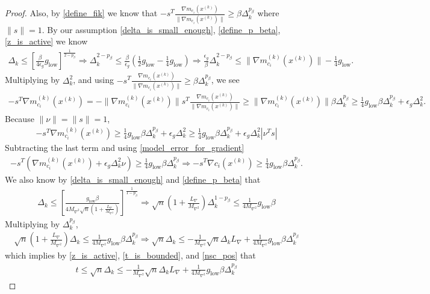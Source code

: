 \documentclass{article}
\theoremstyle{case}
\newcommand{\lipgrad}{{L_{\nabla}}}
\newcommand{\maxhessian}{{M_{\nabla^2}}}
\newcommand{\xk}{{x^{(k)}}}
\newcommand{\dk}{\Delta_k}
\newcommand{\gmcik}{{\nabla m_{c_i}^{(k)}(\xk)}}
\newcommand{\hgik}{{\frac{\nabla m_{c_i}(\xk)}{\|\nabla m_{c_i}(\xk)\|}}}
\newcommand{\mingrad}{{ g_{\text{low}} }}
\begin{document}
\begin{proof}
Also, by \cref{define_fik} we know that $-s^T \hgik \ge \beta \dk^{p_{\beta}}$ where $\|s\| = 1$.
By our assumption \cref{delta_is_small_enough}, \cref{define_p_beta}, \cref{z_is_active} we know
\begin{align*}
\dk \le \left[\frac{\beta}{4\epsilon_{g}}\mingrad \right]^{\frac 1 {2 - p_{\beta}}}
\Longrightarrow \dk^{2 - p_{\beta}} \le \frac{\beta}{\epsilon_{g}}\left(\frac 1 2\mingrad  - \frac 1 4 \mingrad \right)
\Longrightarrow \frac{\epsilon_{g}}{\beta} \dk^{2 - p_{\beta}} \le \|\gmcik\| - \frac 1 4 \mingrad.
\end{align*}
Multiplying by $\dk^2$, and using $-s^T \hgik \ge \beta \dk^{p_{\beta}}$, we see
\begin{align*}
 -s^T\gmcik =  -\|\gmcik\|s^T\hgik \ge \|\gmcik\|\beta\dk^{p_{\beta}} \ge \frac 1 4 \mingrad  \beta \dk^{p_{\beta}} + \epsilon_{g}\dk^2.
\end{align*}
Because $\|\nu\| = \|s\| = 1$,
\begin{align*}
-s^T\gmcik \ge \frac 1 4 \mingrad  \beta \dk^{p_{\beta}} + \epsilon_{g}\dk^2 \ge \frac 1 4 \mingrad  \beta \dk^{p_{\beta}} + \epsilon_{g}\dk^2|\nu^T s|
\end{align*}
Subtracting the last term and using \cref{model_error_for_gradient}
\begin{align}
-s^T\left(\gmcik + \epsilon_{g}\dk^2\nu\right) \ge \frac 1 4 \mingrad  \beta \dk ^{p_{\beta}}
\Longrightarrow -s^T\nabla c_i(\xk) \ge \frac 1 4 \mingrad  \beta \dk^{p_{\beta}}. \label{nsc_pos}
\end{align}
We also know by \cref{delta_is_small_enough} and \cref{define_p_beta} that
\begin{align*}
\dk \le \left[\frac {\mingrad  \beta} {4\maxhessian\sqrt{n}\left(1 + \frac {\lipgrad} \maxhessian \right)}\right]^{\frac1 {1 - p_{\beta}} }
\Longrightarrow \sqrt{n}\left(1 + \frac {\lipgrad} \maxhessian \right) \dk^{1-p_{\beta}}\le \frac 1 {4\maxhessian} \mingrad  \beta
\end{align*}
Multiplying by $\dk^{p_{\beta}}$,
\begin{align*}
\sqrt{n}\left(1 + \frac {\lipgrad} \maxhessian \right) \dk \le \frac 1 {4\maxhessian} \mingrad  \beta \dk^{p_{\beta}}
\Longrightarrow \sqrt{n} \dk \le -\frac 1 \maxhessian \sqrt{n}\dk \lipgrad + \frac 1 {4\maxhessian} \mingrad  \beta \dk^{p_{\beta}}
\end{align*}
which implies by \cref{z_is_active}, \cref{t_is_bounded}, and \cref{nsc_pos} that
\begin{align*}
t 
\le \sqrt{n} \dk 
\le -\frac 1 \maxhessian \sqrt{n}\dk \lipgrad + \frac 1 {4\maxhessian} \mingrad \beta \dk^{p_{\beta}}

\end{align*}
\end{proof}
\end{document}

